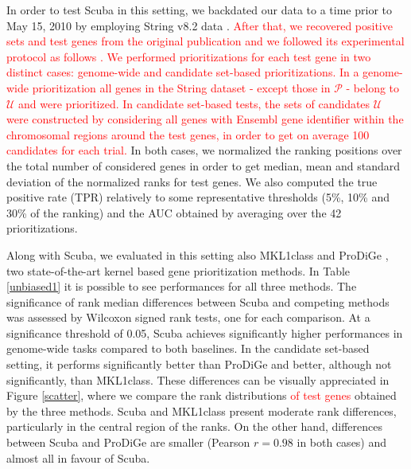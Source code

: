 \documentclass[twocolumn]{bmcart}%
\begin{document}
In order to test Scuba in this setting, we backdated our data to a time prior to May 15, 2010 by employing String v8.2 data \cite{string}. \textcolor{red}{After that, we recovered positive sets and test genes from the original publication and we followed its experimental protocol as follows \cite{bornigen}. We performed prioritizations for each test gene in two distinct cases: genome-wide and candidate set-based prioritizations. In a genome-wide prioritization all genes in the String dataset - except those in $\mathcal{P}$ - belong to $\mathcal{U}$ and were prioritized. In candidate set-based tests, the sets of candidates $\mathcal{U}$ were constructed by considering all genes with Ensembl \cite{ensembl} gene identifier within the chromosomal regions around the test genes, in order to get on average 100 candidates for each trial.} In both cases, we normalized the ranking positions over the total number of considered genes in order to get median, mean and standard deviation of the normalized ranks for test genes. We also computed the true positive rate (TPR) relatively to some representative thresholds (5\%, 10\% and 30\% of the ranking) and the AUC obtained by averaging over the 42 prioritizations.

Along with Scuba, we evaluated in this setting also MKL1class \cite{mkl1class} and ProDiGe \cite{prodige}, two state-of-the-art kernel based gene prioritization methods.  In Table \ref{unbiased1} it is possible to see performances for all three methods. The significance of rank median differences between Scuba and competing methods was assessed by Wilcoxon signed rank tests, one for each comparison. At a significance threshold of 0.05, Scuba achieves significantly higher performances in genome-wide tasks compared to both baselines. In the candidate set-based setting, it performs significantly better than ProDiGe and better, although not significantly, than MKL1class. These differences can be visually appreciated in Figure \ref{scatter}, where we compare the rank distributions \textcolor{red}{of test genes} obtained by the three methods. Scuba and MKL1class present moderate rank differences, particularly in the central region of the ranks. On the other hand, differences between Scuba and ProDiGe are smaller (Pearson $r=0.98$ in both cases) and almost all in favour of Scuba.
\end{document}
